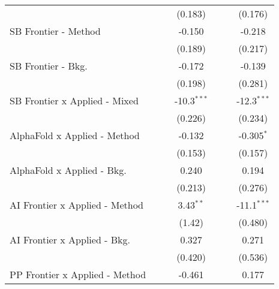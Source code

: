 \begin{tabular}{lcccccc}
                                  &               &               & (0.183)        &               &               & (0.176)\\   
   SB Frontier - Method           &               &               & -0.150         &               &               & -0.218\\   
                                  &               &               & (0.189)        &               &               & (0.217)\\   
   SB Frontier - Bkg.             &               &               & -0.172         &               &               & -0.139\\   
                                  &               &               & (0.198)        &               &               & (0.281)\\   
   SB Frontier x Applied - Mixed  &               &               & -10.3$^{***}$  &               &               & -12.3$^{***}$\\   
                                  &               &               & (0.226)        &               &               & (0.234)\\   
   AlphaFold x Applied - Method   &               &               & -0.132         &               &               & -0.305$^{*}$\\   
                                  &               &               & (0.153)        &               &               & (0.157)\\   
   AlphaFold x Applied - Bkg.     &               &               & 0.240          &               &               & 0.194\\   
                                  &               &               & (0.213)        &               &               & (0.276)\\   
   AI Frontier x Applied - Method &               &               & 3.43$^{**}$    &               &               & -11.1$^{***}$\\   
                                  &               &               & (1.42)         &               &               & (0.480)\\   
   AI Frontier x Applied - Bkg.   &               &               & 0.327          &               &               & 0.271\\   
                                  &               &               & (0.420)        &               &               & (0.536)\\   
   PP Frontier x Applied - Method &               &               & -0.461         &               &               & 0.177\\   

\end{tabular}
